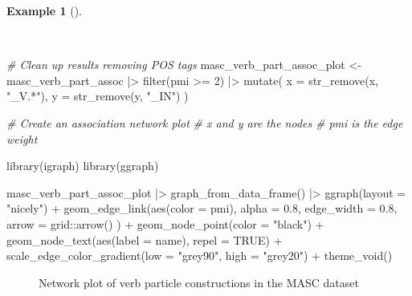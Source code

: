 \documentclass[
  letterpaper,
  DIV=11,
  numbers=noendperiod]{scrreprt}
\newenvironment{Shaded}{\begin{snugshade}}{\end{snugshade}}
\newcommand{\AttributeTok}[1]{\textcolor[rgb]{0.00,0.00,0.00}{#1}}
\newcommand{\CommentTok}[1]{\textcolor[rgb]{0.00,0.00,0.00}{\textit{#1}}}
\newcommand{\ConstantTok}[1]{\textcolor[rgb]{0.00,0.00,0.00}{#1}}
\newcommand{\DecValTok}[1]{\textcolor[rgb]{0.00,0.00,0.00}{#1}}
\newcommand{\FloatTok}[1]{\textcolor[rgb]{0.00,0.00,0.00}{#1}}
\newcommand{\FunctionTok}[1]{\textcolor[rgb]{0.00,0.00,0.00}{#1}}
\newcommand{\NormalTok}[1]{\textcolor[rgb]{0.00,0.00,0.00}{#1}}
\newcommand{\OtherTok}[1]{\textcolor[rgb]{0.00,0.00,0.00}{#1}}
\newcommand{\SpecialCharTok}[1]{\textcolor[rgb]{0.00,0.00,0.00}{#1}}
\newcommand{\StringTok}[1]{\textcolor[rgb]{0.00,0.00,0.00}{#1}}
\theoremstyle{definition}
\newtheorem{example}{Example}[chapter]
\theoremstyle{remark}
\begin{document}
\begin{example}[]\protect\hypertarget{exm-eda-masc-verb-part-network}{}\label{exm-eda-masc-verb-part-network}

~

\begin{Shaded}
\begin{Highlighting}[]
\CommentTok{\# Clean up results removing POS tags}
\NormalTok{masc\_verb\_part\_assoc\_plot }\OtherTok{\textless{}{-}}
\NormalTok{  masc\_verb\_part\_assoc }\SpecialCharTok{|\textgreater{}}
  \FunctionTok{filter}\NormalTok{(pmi }\SpecialCharTok{\textgreater{}=} \DecValTok{2}\NormalTok{) }\SpecialCharTok{|\textgreater{}}
  \FunctionTok{mutate}\NormalTok{(}
    \AttributeTok{x =} \FunctionTok{str\_remove}\NormalTok{(x, }\StringTok{"\_V.*"}\NormalTok{),}
    \AttributeTok{y =} \FunctionTok{str\_remove}\NormalTok{(y, }\StringTok{"\_IN"}\NormalTok{)}
\NormalTok{  )}

\CommentTok{\# Create an association network plot}
\CommentTok{\# \textasciigrave{}x\textasciigrave{} and \textasciigrave{}y\textasciigrave{} are the nodes}
\CommentTok{\# \textasciigrave{}pmi\textasciigrave{} is the edge weight}

\FunctionTok{library}\NormalTok{(igraph)}
\FunctionTok{library}\NormalTok{(ggraph)}

\NormalTok{masc\_verb\_part\_assoc\_plot }\SpecialCharTok{|\textgreater{}}
  \FunctionTok{graph\_from\_data\_frame}\NormalTok{() }\SpecialCharTok{|\textgreater{}}
  \FunctionTok{ggraph}\NormalTok{(}\AttributeTok{layout =} \StringTok{"nicely"}\NormalTok{) }\SpecialCharTok{+}
  \FunctionTok{geom\_edge\_link}\NormalTok{(}\FunctionTok{aes}\NormalTok{(}\AttributeTok{color =}\NormalTok{ pmi),}
    \AttributeTok{alpha =} \FloatTok{0.8}\NormalTok{,}
    \AttributeTok{edge\_width =} \FloatTok{0.8}\NormalTok{,}
    \AttributeTok{arrow =}\NormalTok{ grid}\SpecialCharTok{::}\FunctionTok{arrow}\NormalTok{()}
\NormalTok{  ) }\SpecialCharTok{+}
  \FunctionTok{geom\_node\_point}\NormalTok{(}\AttributeTok{color =} \StringTok{"black"}\NormalTok{) }\SpecialCharTok{+}
  \FunctionTok{geom\_node\_text}\NormalTok{(}\FunctionTok{aes}\NormalTok{(}\AttributeTok{label =}\NormalTok{ name), }\AttributeTok{repel =} \ConstantTok{TRUE}\NormalTok{) }\SpecialCharTok{+}
  \FunctionTok{scale\_edge\_color\_gradient}\NormalTok{(}\AttributeTok{low =} \StringTok{"grey90"}\NormalTok{, }\AttributeTok{high =} \StringTok{"grey20"}\NormalTok{) }\SpecialCharTok{+}
  \FunctionTok{theme\_void}\NormalTok{()}
\end{Highlighting}
\end{Shaded}

\begin{figure}[H]


\caption{\label{fig-eda-masc-verb-part-network}Network plot of verb
particle constructions in the MASC dataset}

\end{figure}%

\end{example}
\end{document}
